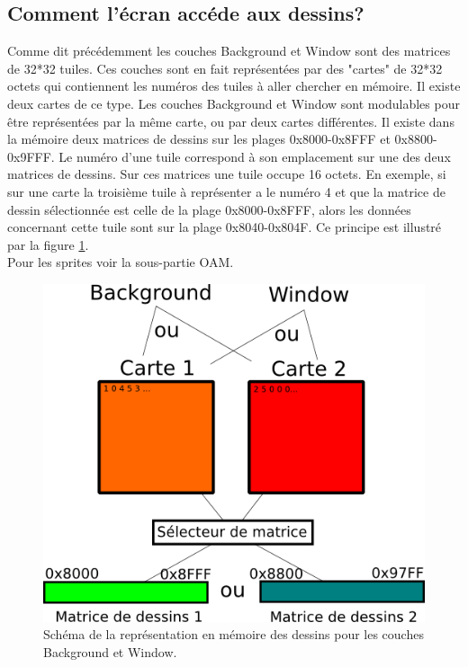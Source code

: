 \documentclass[french]{report}
\begin{document}
\subsection{Comment l'écran accéde aux dessins?}

Comme dit précédemment les couches Background et Window sont des matrices de 32*32 tuiles. Ces couches sont en fait représentées par des "cartes" de 32*32 octets qui contiennent les numéros des tuiles à aller chercher en mémoire. Il existe deux cartes de ce type. Les couches Background et Window sont modulables pour être représentées par la même carte, ou par deux cartes différentes. Il existe dans la mémoire deux matrices de dessins sur les plages 0x8000-0x8FFF et 0x8800-0x9FFF. Le numéro d'une tuile correspond à son emplacement sur une des deux matrices de dessins. Sur ces matrices une tuile occupe 16 octets. En exemple, si sur une carte la troisième tuile à représenter a le numéro 4 et que la matrice de dessin sélectionnée est celle de la plage 0x8000-0x8FFF, alors les données concernant cette tuile sont sur la plage 0x8040-0x804F. Ce principe est illustré par la figure \ref{gpu_dessins}.\\Pour les sprites voir la sous-partie OAM.

\begin{figure}[!h]
\centering
\includegraphics[scale=0.8]{images/schema_matrice_dessin.png}
\caption{Schéma de la représentation en mémoire des dessins pour les couches Background et Window.}
\label{gpu_dessins}
\end{figure}
\end{document}
